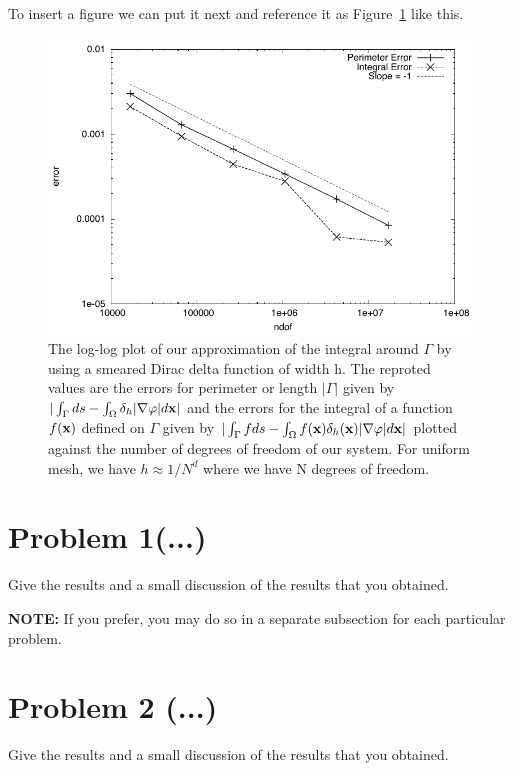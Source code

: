 \documentclass[11pt]{article}
\begin{document}
To insert a figure we can put it next and reference it as Figure~\ref{fig:conv_rates_LinfL2} like this.
\begin{figure}[h!]
	\centering
		 \includegraphics[scale=1.0]{levelset_convergence_rate}
	 	\caption{The log-log plot of our approximation of the integral around $\Gamma$ by using a smeared Dirac delta function of width h.  The reproted values are the errors for perimeter or length $|\Gamma|$ given by $|\int_{\Gamma}ds - \int_{\Omega}\delta_{h}|\nabla\varphi|d\textbf{x}|$ and the errors for the integral of a function $f(\textbf{x})$ defined on $\Gamma$ given by $|\int_{\Gamma}fds - \int_{\Omega}f(\textbf{x})\delta_{h}(\textbf{x})|\nabla\varphi|d\textbf{x}|$ plotted against the number of degrees of freedom of our system.  For uniform mesh, we have $h \approx 1/N^d$ where we have N degrees of freedom.}
  \label{fig:conv_rates_LinfL2}
\end{figure}

\newpage

\section{Problem 1(...)}
Give the results and a small discussion of the results that you obtained.

{\bf NOTE:} If you prefer, you may do so in 
a separate subsection for each particular problem.

\section{Problem 2 (...)}
Give the results and a small discussion of the results that you obtained.
\end{document}
